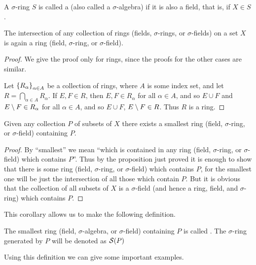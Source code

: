 \begin{definition}
A $\sigma$-ring $S$ is called a  (also called a $\sigma$-algebra) if it is also a field, that is, if $X\in S$.
\end{definition}

\begin{proposition}
The intersection of any collection of rings (fields, $\sigma$-rings, or $\sigma$-fields) on a set $X$ is again a ring (field, $\sigma$-ring, or $\sigma$-field).
\end{proposition}
\begin{proof}
We give the proof only for rings, since the proofs for the other cases are similar.

Let $\left\{R_\alpha\right\}_{\alpha\in A}$ be a collection of rings, where $A$ is some index set, and let $R =\bigcap_{\alpha\in A}R_\alpha$. If $E,F\in R$, then $E,F\in R_\alpha$ for all $\alpha\in A$, and so $E\cup F$ and $E\setminus F\in R_\alpha$ for all $\alpha\in A$, and so $E\cup F$, $E\setminus F\in R$. Thus $R$ is a ring.
\end{proof}

\begin{corollary}
Given any collection $P$ of subsets of $X$ there exists a smallest ring (field, $\sigma$-ring, or $\sigma$-field) containing $P$.
\end{corollary}
\begin{proof}
By ``smallest'' we mean ``which is contained in any ring (field, $\sigma$-ring, or $\sigma$-field) which contains $P$''. Thus by the proposition just proved it is enough to show that there is some ring (field, $\sigma$-ring, or $\sigma$-field) which contains $P$, for the smallest one will be just the intersection of all those which contain $P$. But it is obvious that the collection of all subsets of $X$ is a $\sigma$-field (and hence a ring, field, and $\sigma$-ring) which contains $P$.
\end{proof}

This corollary allows us to make the following definition.

\begin{definition}\label{def:generate sets}
The smallest ring (field, $\sigma$-algebra, or $\sigma$-field) containing $P$ is called . The $\sigma$-ring generated by $P$ will be denoted as ${\cal S}(P)$
\end{definition}

Using this definition we can give some important examples.

